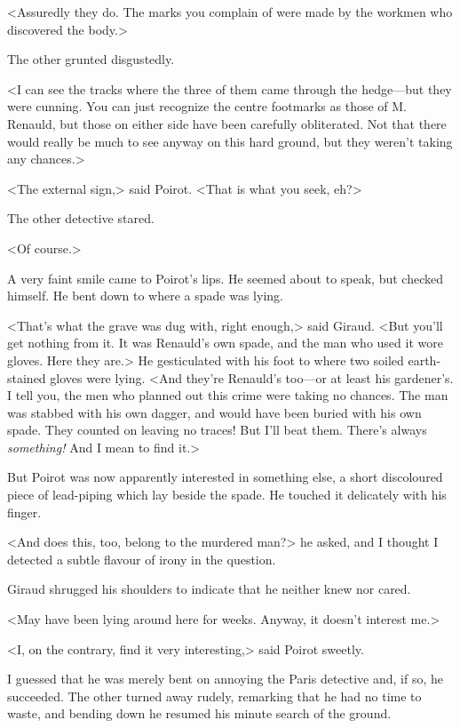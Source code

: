  <Assuredly they do. The marks you complain of were made by the workmen who discovered the body.> 

 The other grunted disgustedly. 

 <I can see the tracks where the three of them came through the hedge—but they were cunning. You can just recognize the centre footmarks as those of M. Renauld, but those on either side have been carefully obliterated. Not that there would really be much to see anyway on this hard ground, but they weren't taking any chances.> 

 <The external sign,> said Poirot. <That is what you seek, eh?> 

 The other detective stared. 

 <Of course.> 

 A very faint smile came to Poirot's lips. He seemed about to speak, but checked himself. He bent down to where a spade was lying. 

 <That's what the grave was dug with, right enough,> said Giraud. <But you'll get nothing from it. It was Renauld's own spade, and the man who used it wore gloves. Here they are.> He gesticulated with his foot to where two soiled earth-stained gloves were lying. <And they're Renauld's too—or at least his gardener's. I tell you, the men who planned out this crime were taking no chances. The man was stabbed with his own dagger, and would have been buried with his own spade. They counted on leaving no traces! But I'll beat them. There's always \emph{something!} And I mean to find it.> 

 But Poirot was now apparently interested in something else, a short discoloured piece of lead-piping which lay beside the spade. He touched it delicately with his finger. 

 <And does this, too, belong to the murdered man?> he asked, and I thought I detected a subtle flavour of irony in the question. 

 Giraud shrugged his shoulders to indicate that he neither knew nor cared. 

 <May have been lying around here for weeks. Anyway, it doesn't interest me.> 

 <I, on the contrary, find it very interesting,> said Poirot sweetly. 

 I guessed that he was merely bent on annoying the Paris detective and, if so, he succeeded. The other turned away rudely, remarking that he had no time to waste, and bending down he resumed his minute search of the ground. 


